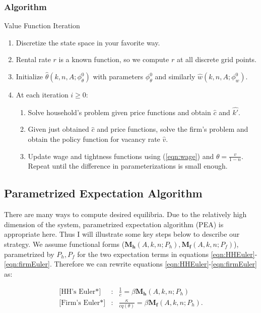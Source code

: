 \documentclass[12pt]{article}
\begin{document}
\subsubsection{Algorithm}
\begin{algorithm}
	\caption{Value Function Iteration}
	\label{alg:VFI}
	\begin{enumerate}
		\item Discretize the state space in your favorite way.
		\item Rental rate $r$ is a known function, so we compute $r$ at all discrete grid points.
		\item Initialize $\hat{\theta}(k,n,A;\phi_{\theta}^{0})$ with parameters $\phi_{\theta}^{0}$ and similarly $\hat{w}(k,n,A;\phi_{w}^{0})$.
		\item At each iteration $i \ge 0$:
			\begin{enumerate}
			\item Solve household's problem given price functions and obtain $\hat{c}$ and $\hat{k'}$.
			\item Given just obtained $\hat{c}$ and price functions, solve the firm's problem and obtain the policy function for vacancy rate $\hat{v}$.
			\item Update wage and tightness functions using (\ref{eqn:wage}) and $\theta = \frac{v}{1-n}$. Repeat until the difference in parameterizations is small enough.
			\end{enumerate}	
	\end{enumerate}
\end{algorithm}

\subsection{Parametrized Expectation Algorithm}
There are many ways to compute desired equilibria. Due to the relatively high dimension of the system, parametrized expectation algorithm (PEA) is appropriate here. Thus I will illustrate some key steps below to describe our strategy. We assume functional forms ($\mathbf{M_{h}}(A,k,n;P_{h}),\mathbf{M_{f}}(A,k,n;P_{f})$), parametrized by $P_{h},P_{f}$ for the two expectation terms in equations \ref{eqn:HHEuler}-\ref{eqn:firmEuler}. Therefore we can rewrite equations \ref{eqn:HHEuler}-\ref{eqn:firmEuler} as:

\begin{eqnarray}
	\text{[HH's Euler*]} & :& \frac{1}{c} =\beta  \label{eqn:HHEuler*} \mathbf{M_{h}}(A,k,n;P_{h}) \\
	\text{[Firm's Euler*]} & :& \frac{\kappa}{c q(\theta)} = \beta \mathbf{M_{f}}(A,k,n;P_{h}).
	\label{eqn:firmEuler*}
\end{eqnarray}
\end{document}
